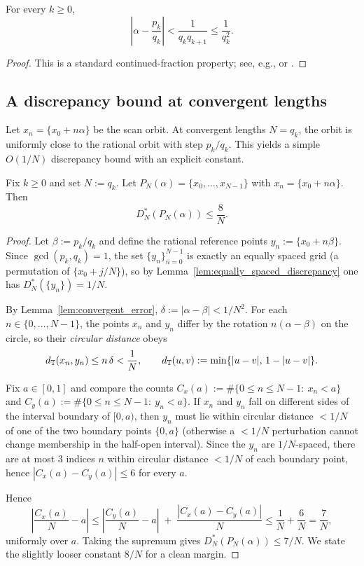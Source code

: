 \begin{lemma}
\label{lem:convergent_error}
For every $k\ge 0$,
\[
\left|\alpha-\frac{p_k}{q_k}\right|
<\frac{1}{q_k q_{k+1}}
\le \frac{1}{q_k^2}.
\]
\end{lemma}
\begin{proof}
This is a standard continued-fraction property; see, e.g.,
\cite[Ch.\ 10]{HardyWright2008} or \cite{KuipersNiederreiter1974}.
\end{proof}

\subsection{A discrepancy bound at convergent lengths}
\label{app:discrepancy_convergent_lengths}
Let $x_n=\{x_0+n\alpha\}$ be the scan orbit.
At convergent lengths $N=q_k$, the orbit is uniformly close to the rational
orbit with step $p_k/q_k$.
This yields a simple $O(1/N)$ discrepancy bound with an explicit constant.

\begin{lemma}
\label{lem:convergent_length_discrepancy}
Fix $k\ge 0$ and set $N:=q_k$.
Let $P_N(\alpha)=\{x_0,\dots,x_{N-1}\}$ with $x_n=\{x_0+n\alpha\}$.
Then
\[
D_N^\ast(P_N(\alpha))\le \frac{8}{N}.
\]
\end{lemma}
\begin{proof}
Let $\beta:=p_k/q_k$ and define the rational reference points
$y_n:=\{x_0+n\beta\}$.
Since $\gcd(p_k,q_k)=1$, the set $\{y_n\}_{n=0}^{N-1}$ is exactly an equally
spaced grid (a permutation of $\{x_0+j/N\}$), so by
Lemma~\ref{lem:equally_spaced_discrepancy} one has $D_N^\ast(\{y_n\})=1/N$.

By Lemma~\ref{lem:convergent_error}, $\delta:=|\alpha-\beta|<1/N^2$.
For each $n\in\{0,\ldots,N-1\}$, the points $x_n$ and $y_n$ differ by the
rotation $n(\alpha-\beta)$ on the circle, so their \emph{circular distance}
obeys
\[
d_{\mathbb{T}}(x_n,y_n)\le n\,\delta < \frac{1}{N},
\qquad
d_{\mathbb{T}}(u,v):=\min\{|u-v|,\,1-|u-v|\}.
\]

Fix $a\in[0,1]$ and compare the counts
$C_x(a):=\#\{0\le n\le N-1:\ x_n<a\}$ and
$C_y(a):=\#\{0\le n\le N-1:\ y_n<a\}$.
If $x_n$ and $y_n$ fall on different sides of the interval boundary
of $[0,a)$, then $y_n$ must lie within circular distance $<1/N$ of one of the
two boundary points $\{0,a\}$ (otherwise a $<1/N$ perturbation cannot change
membership in the half-open interval).
Since the $y_n$ are $1/N$-spaced, there are at most $3$ indices $n$ within
circular distance $<1/N$ of each boundary point, hence
$|C_x(a)-C_y(a)|\le 6$ for every $a$.

Hence
\[
\left|\frac{C_x(a)}{N}-a\right|
\le
\left|\frac{C_y(a)}{N}-a\right|
\;+\;
\frac{|C_x(a)-C_y(a)|}{N}
\le \frac{1}{N}+\frac{6}{N}=\frac{7}{N},
\]
uniformly over $a$.
Taking the supremum gives $D_N^\ast(P_N(\alpha))\le 7/N$.
We state the slightly looser constant $8/N$ for a clean margin.
\end{proof}

